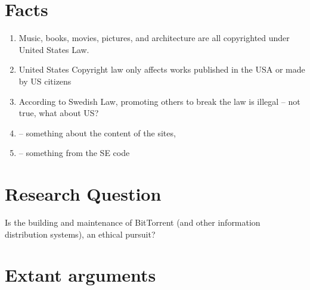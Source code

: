 \documentclass[11pt]{article}
\begin{document}
\section{Facts}
\begin{enumerate}
\item Music, books, movies, pictures, and architecture are all copyrighted under United States Law. \cite{t17c1s102}
\item United States Copyright law only affects works published in the USA or made by US citizens \cite{t17c1s103}
\item According to Swedish Law, promoting others to break the law is illegal -- not true, what about US?
\item -- something about the content of the sites,
\item -- something from the SE code
\end{enumerate}

\section{Research Question}

Is the building and maintenance of BitTorrent (and other information distribution systems), an ethical pursuit?

\section{Extant arguments}
\end{document}
